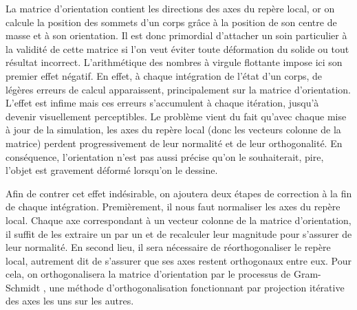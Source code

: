 La matrice d'orientation contient les directions des axes du repère
local, or on calcule la position des sommets d'un corps grâce à la
position de son centre de masse et à son orientation. Il est donc
primordial d'attacher un soin particulier à la validité de cette
matrice si l'on veut éviter toute déformation du solide ou tout
résultat incorrect. L'arithmétique des nombres à virgule flottante
impose ici son premier effet négatif. En effet, à chaque intégration
de l'état d'un corps, de légères erreurs de calcul apparaissent,
principalement sur la matrice d'orientation. L'effet est infime mais
ces erreurs s'accumulent à chaque itération, jusqu'à devenir
visuellement perceptibles. Le problème vient du fait qu'avec chaque
mise à jour de la simulation, les axes du repère local (donc les
vecteurs colonne de la matrice) perdent progressivement de leur
normalité et de leur orthogonalité. En conséquence, l'orientation
n'est pas aussi précise qu'on le souhaiterait, pire, l'objet est
gravement déformé lorsqu'on le dessine.

Afin de contrer cet effet indésirable, on ajoutera deux étapes de
correction à la fin de chaque intégration. Premièrement, il nous faut
normaliser les axes du repère local. Chaque axe correspondant à un
vecteur colonne de la matrice d'orientation, il suffit de les extraire
un par un et de recalculer leur magnitude pour s'assurer de leur
normalité. En second lieu, il sera nécessaire de réorthogonaliser le
repère local, autrement dit de s'assurer que ses axes restent
orthogonaux entre eux. Pour cela, on orthogonalisera la matrice
d'orientation par le processus de Gram-Schmidt \cite{weber}, une
méthode d'orthogonalisation fonctionnant par projection itérative des
axes les uns sur les autres.

